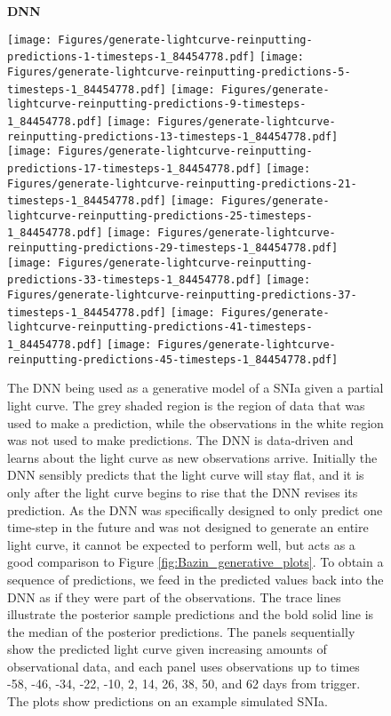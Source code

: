 \documentclass[fleqn,usenatbib]{mnras}
\begin{document}
\begin{figure*}
\centering
\textbf{DNN}\par\medskip
\vspace{-0.5em}
    {\texttt{[image: Figures/generate-lightcurve-reinputting-predictions-1-timesteps-1\_84454778.pdf]}}
    {\texttt{[image: Figures/generate-lightcurve-reinputting-predictions-5-timesteps-1\_84454778.pdf]}}
    {\texttt{[image: Figures/generate-lightcurve-reinputting-predictions-9-timesteps-1\_84454778.pdf]}}
    {\texttt{[image: Figures/generate-lightcurve-reinputting-predictions-13-timesteps-1\_84454778.pdf]}}
    {\texttt{[image: Figures/generate-lightcurve-reinputting-predictions-17-timesteps-1\_84454778.pdf]}}
    {\texttt{[image: Figures/generate-lightcurve-reinputting-predictions-21-timesteps-1\_84454778.pdf]}}
    {\texttt{[image: Figures/generate-lightcurve-reinputting-predictions-25-timesteps-1\_84454778.pdf]}}
    {\texttt{[image: Figures/generate-lightcurve-reinputting-predictions-29-timesteps-1\_84454778.pdf]}}
    {\texttt{[image: Figures/generate-lightcurve-reinputting-predictions-33-timesteps-1\_84454778.pdf]}}
    {\texttt{[image: Figures/generate-lightcurve-reinputting-predictions-37-timesteps-1\_84454778.pdf]}}
    {\texttt{[image: Figures/generate-lightcurve-reinputting-predictions-41-timesteps-1\_84454778.pdf]}}
    {\texttt{[image: Figures/generate-lightcurve-reinputting-predictions-45-timesteps-1\_84454778.pdf]}}

\caption[The DNN being used as a generative model of a SNIa given partial light curves.]{The DNN being used as a generative model of a SNIa given a partial light curve. The grey shaded region is the region of data that was used to make a prediction, while the observations in the white region was not used to make predictions. The DNN is data-driven and learns about the light curve as new observations arrive. Initially the DNN sensibly predicts that the light curve will stay flat, and it is only after the light curve begins to rise that the DNN revises its prediction. As the DNN was specifically designed to only predict one time-step in the future and was not designed to generate an entire light curve, it cannot be expected to perform well, but acts as a good comparison to Figure \ref{fig:Bazin_generative_plots}. To obtain a sequence of predictions, we feed in the predicted values back into the DNN as if they were part of the observations. The trace lines illustrate the posterior sample predictions and the bold solid line is the median of the posterior predictions. The panels sequentially show the predicted light curve given increasing amounts of observational data, and each panel uses observations up to times -58, -46, -34, -22, -10, 2, 14, 26, 38, 50, and 62 days from trigger. The plots show predictions on an example simulated SNIa.}
    \label{fig:DNN_generative_plots}
\end{figure*}
\end{document}
